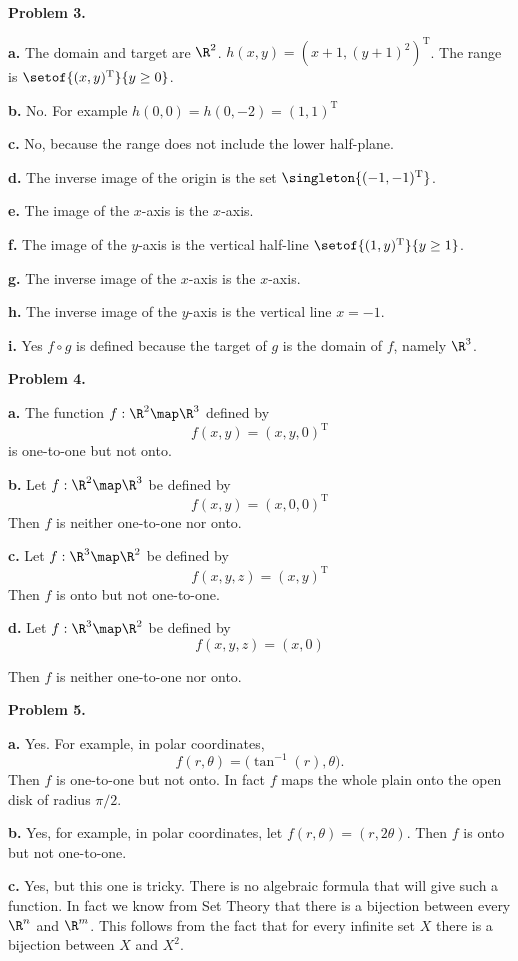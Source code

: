 \documentclass[oneside,12pt]{amsart}
\begin{document}
\textbf{Problem 3.}

\textbf{a.}  The domain and target are $\R^2$.
$h(x,y) = (x+1, (y+1)^2)^{\text{T}}$.
The range is $\setof{(x,y)^{\text{T}}}{y\geq 0}$.

\medskip

\textbf{b.} No. For example $h(0,0) = h(0, -2) = (1, 1)^{\text{T}}$


\textbf{c.} No, because the range does not include the lower half-plane.

\textbf{d.} The inverse image of the origin is the set $\singleton{(-1, -1)^{\text{T}}}$.

\textbf{e.} The image of the $x$-axis is the $x$-axis.


\textbf{f.} The image of the $y$-axis is the vertical half-line
$\setof{(1, y)^{\text{T}}}{y\geq 1}$.

\textbf{g.} The inverse image of the $x$-axis is the $x$-axis.

\textbf{h.} The inverse image of the $y$-axis is the vertical line $x=-1$.

\textbf{i.} Yes $f \circ g$ is defined because the target of $g$ is the domain
of $f$, namely $\R^3$.

\medskip

\textbf{Problem 4.}

\textbf{a.} The function $f:\R^2\map\R^3$ defined by
$$f(x,y) = (x, y, 0 )^{\text{T}}$$
is one-to-one but not onto.

\textbf{b.} Let $f:\R^2\map\R^3$ be defined by
$$f(x,y) = (x, 0, 0)^{\text{T}}$$
Then $f$ is neither one-to-one nor onto.

\textbf{c.} Let $f:\R^3\map\R^2$ be defined by
$$f(x,y, z) = (x, y)^{\text{T}}$$
Then $f$ is onto but not one-to-one.

\bigskip

\textbf{d.} Let $f:\R^3\map\R^2$ be defined by
$$f(x,y, z) = (x, 0)$$

Then $f$ is neither one-to-one nor onto.


\medskip

\textbf{Problem 5.}

\smallskip

\textbf{a.} Yes. For example, in polar coordinates,
$$f(r,\theta) = \big( \tan^{-1}(r), \theta \big).$$
Then $f$ is one-to-one but not onto. In fact $f$ maps the whole plain onto
the open disk of radius $\pi/2$.


\textbf{b.} Yes, for example, in polar coordinates, let
$f(r,\theta) = (r, 2\theta)$. Then $f$ is onto but not one-to-one.


\textbf{c.} Yes, but this one is tricky. There is no algebraic formula that
will give such a function. In fact we know from Set Theory that there is a
bijection between every $\R^n$ and $\R^m$. This follows from the fact that
for every infinite set $X$ there is a bijection between $X$ and $X^2$.
\end{document}
